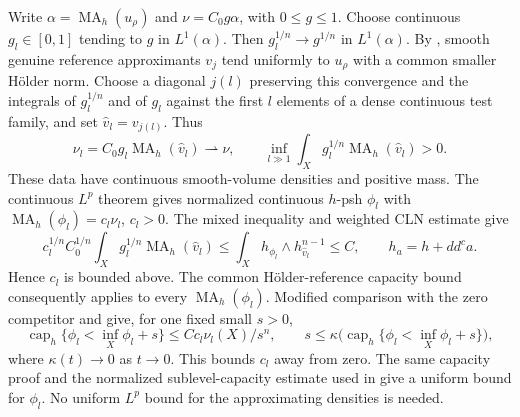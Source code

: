 \documentclass[11pt]{article}
\newcommand{\ddc}{dd^c}
\newcommand{\MA}{\operatorname{MA}}
\begin{document}
Write $\alpha=\MA_h(u_\rho)$ and $\nu=C_0g\alpha$, with $0\leq g\leq1$.
Choose continuous $g_l\in[0,1]$ tending to $g$ in $L^1(\alpha)$.
Then $g_l^{1/n}\to g^{1/n}$ in $L^1(\alpha)$. By
\cite[Lemma 2.3]{KN}, smooth genuine reference approximants $v_j$ tend
uniformly to $u_\rho$ with a common smaller H\"older norm. Choose a
diagonal $j(l)$ preserving this convergence and the integrals of
$g_l^{1/n}$ and of $g_l$ against the first $l$ elements of a dense
continuous test family, and set $\widehat v_l=v_{j(l)}$. Thus
\[
 \nu_l=C_0g_l\MA_h(\widehat v_l)\rightharpoonup\nu,\qquad
 \inf_{l\gg1}\int_Xg_l^{1/n}\MA_h(\widehat v_l)>0.
\]
These data have continuous smooth-volume densities and positive mass.
The continuous $L^p$ theorem \cite[Theorem 0.1]{KN13} gives normalized
continuous $h$-psh $\phi_l$ with $\MA_h(\phi_l)=c_l\nu_l$, $c_l>0$.
The mixed inequality and weighted CLN estimate
\cite[Proposition 1.1 and Lemma 1.9]{Ngu} give
\[
 c_l^{1/n}C_0^{1/n}\int_Xg_l^{1/n}\MA_h(\widehat v_l)
 \leq\int_Xh_{\phi_l}\wedge h_{\widehat v_l}^{n-1}\leq C,
 \qquad h_a=h+\ddc a.
\]
Hence $c_l$ is bounded above. The common H\"older-reference capacity
bound \cite[Lemma 2.1 and Corollary 2.2]{KN} consequently applies to every
$\MA_h(\phi_l)$. Modified comparison with the zero competitor and
\cite[Theorem 5.3 and Lemma 5.4]{KN13} give, for one fixed small $s>0$,
\[
 \operatorname{cap}_h\{\phi_l<\inf_X\phi_l+s\}
 \leq Cc_l\nu_l(X)/s^n,\qquad
 s\leq\kappa\bigl(\operatorname{cap}_h\{\phi_l<\inf_X\phi_l+s\}\bigr),
\]
where $\kappa(t)\to0$ as $t\to0$. This bounds $c_l$ away from zero.
The same capacity proof and the normalized sublevel-capacity estimate
used in \cite[Corollary 5.6]{KN13} give a uniform bound for $\phi_l$.
No uniform $L^p$ bound for the approximating densities is needed.
\end{document}
